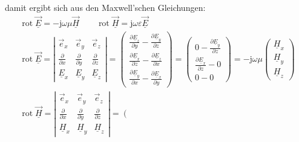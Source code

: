 	damit ergibt sich aus den Maxwell'schen Gleichungen:
	{\footnotesize
	$$
		\begin{gathered}
			\boxed{\operatorname{rot} \underline{\vec{E}}=-\mathrm{j} \omega \mu \underline{\vec{H}}} \qquad \boxed{\operatorname{rot} \underline{\vec{H}}=\mathrm{j} \omega \varepsilon \underline{\vec{E}}} \\
			\operatorname{rot} \underline{\vec{E}}=\left|\begin{array}{ccc}
				\vec{e}_x                   & \vec{e}_y                   & \vec{e}_z                   \\
				\frac{\partial}{\partial x} & \frac{\partial}{\partial y} & \frac{\partial}{\partial z} \\
				\underline{E}_x             & \underline{E}_y             & \underline{E}_z
			\end{array}\right|=\left(\begin{array}{c}
					\frac{\partial \underline{E}_z}{\partial y}-\frac{\partial \underline{E}_y}{\partial z} \\
					\frac{\partial \underline{E}_x}{\partial z}-\frac{\partial \underline{E}_z}{\partial x} \\
					\frac{\partial \underline{E}_y}{\partial x}-\frac{\partial \underline{E}_x}{\partial y}
				\end{array}\right)=\left(\begin{array}{l}
					0-\frac{\partial \underline{E}_y}{\partial z} \\
					\frac{\partial \underline{E}_x}{\partial z}-0 \\
					0-0
				\end{array}\right)=-\mathrm{j} \omega \mu\left(\begin{array}{l}
					\underline{H}_x \\
					\underline{H}_y \\
					\underline{H}_z
				\end{array}\right) \\
			\operatorname{rot} \underline{\vec{H}}=\left|\begin{array}{ccc}
				\vec{e}_x                   & \vec{e}_y                   & \vec{e}_z                   \\
				\frac{\partial}{\partial x} & \frac{\partial}{\partial y} & \frac{\partial}{\partial z} \\
				\underline{H}_x             & \underline{H}_y             & \underline{H}_z
			\end{array}\right|=\left(\begin{array}{c}

\end{array}
\end{gathered}$$}
